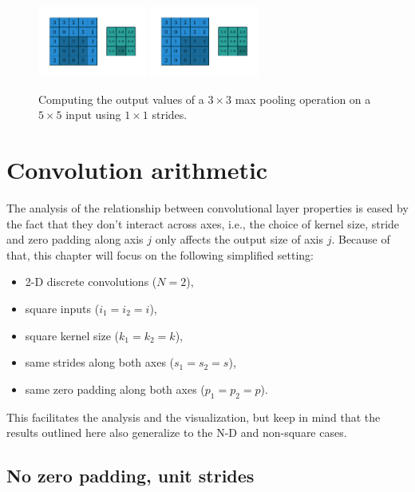 \begin{figure}[p]
    \includegraphics[width=0.32\textwidth]{pdf/numerical_max_pooling_07.pdf}
    \includegraphics[width=0.32\textwidth]{pdf/numerical_max_pooling_08.pdf}
    \caption{\label{fig:numerical_max_pooling} Computing the output values of a
        $3 \times 3$ max pooling operation on a $5 \times 5$ input using $1
        \times 1$ strides.}
\end{figure}

\chapter{Convolution arithmetic}

The analysis of the relationship between convolutional layer properties is eased
by the fact that they don't interact across axes, i.e., the choice of kernel
size, stride and zero padding along axis $j$ only affects the output size of
axis $j$. Because of that, this chapter will focus on the following simplified
setting:

\begin{itemize}
    \item 2-D discrete convolutions ($N = 2$),
    \item square inputs ($i_1 = i_2 = i$),
    \item square kernel size ($k_1 = k_2 = k$),
    \item same strides along both axes ($s_1 = s_2 = s$),
    \item same zero padding along both axes ($p_1 = p_2 = p$).
\end{itemize}

This facilitates the analysis and the visualization, but keep in mind that the
results outlined here also generalize to the N-D and non-square cases.

\section{No zero padding, unit strides}

